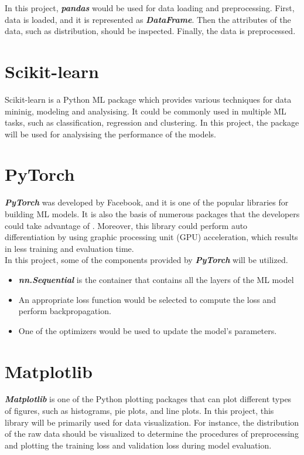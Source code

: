 \documentclass[12pt,twoside]{report}
\begin{document}
In this project, \textbf{\textit{pandas}} would be used for data loading and preprocessing. First, data is loaded, and it is represented as \textbf{\textit{DataFrame}}. Then the attributes of the data, such as distribution, should be inspected. Finally, the data is preprocessed.

\section{Scikit-learn}
Scikit-learn is a Python ML package which provides various techniques for data mininig, modeling and analysising. It could be commonly used in multiple ML tasks, such as classification, regression and clustering. In this project, the package will be used for analysising the performance of the models. 

\section{PyTorch}
\textbf{\textit{PyTorch}} was developed by Facebook, and it is one of the popular libraries for building ML models. It is also the basis of numerous packages that the developers could take advantage of \citep{RN5}. Moreover, this library could perform auto differentiation by using graphic processing unit (GPU) acceleration, which results in less training and evaluation time. 
\\

In this project, some of the components provided by \textbf{\textit{PyTorch}} will be utilized.
\begin{itemize}
	\item \textbf{\textit{nn.Sequential}} is the container that contains all the layers of the ML model
	\item An appropriate loss function would be selected to compute the loss and perform backpropagation. 
	\item One of the optimizers would be used to update the model's parameters. 
\end{itemize}

\section{Matplotlib}
\textbf{\textit{Matplotlib}} is one of the Python plotting packages that can plot different types of figures, such as histograms, pie plots, and line plots. In this project, this library will be primarily used for data visualization. For instance, the distribution of the raw data should be visualized to determine the procedures of preprocessing and plotting the training loss and validation loss during model evaluation. 
\end{document}
